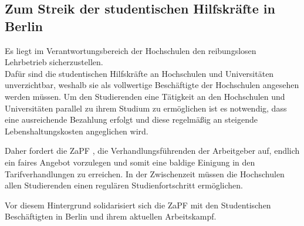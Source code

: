 
\subsection*{Zum Streik der studentischen Hilfskräfte in Berlin}
Es liegt im Verantwortungsbereich der Hochschulen den	reibungslosen
Lehrbetrieb	sicherzustellen.\\
Dafür sind die studentischen Hilfskräfte an	Hochschulen	und
Universitäten	unverzichtbar, weshalb sie als vollwertige Beschäftigte	der	Hochschulen	angesehen
werden	müssen.	Um	den	Studierenden	eine	Tätigkeit	an	den	Hochschulen	und	Universitäten	parallel
zu	ihrem	Studium	zu	ermöglichen	ist	es	notwendig,	dass	eine	ausreichende	Bezahlung	erfolgt	und
diese	regelmäßig	an	steigende	Lebenshaltungskosten	angeglichen	wird.

Daher	fordert	die	ZaPF , die Verhandlungsführenden der Arbeitgeber auf,	endlich	ein	faires	Angebot	vorzulegen	und	somit	eine
baldige	Einigung	in	den	Tarifverhandlungen	zu	erreichen.	In	der	Zwischenzeit	müssen	die
Hochschulen	allen	Studierenden	einen	regulären	Studienfortschritt	ermöglichen.

Vor	diesem	Hintergrund	solidarisiert	sich	die	ZaPF	mit	den	Studentischen	Beschäftigten	in	Berlin
und	ihrem	aktuellen	Arbeitskampf.

